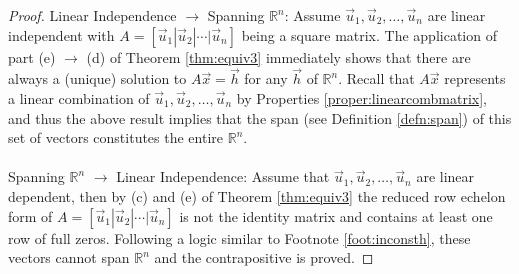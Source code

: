 \begin{proof}
Linear Independence $\rightarrow$ Spanning $\mathbb{R}^n$: Assume $\vec{u}_1, \vec{u}_2, \ldots, \vec{u}_n$ are linear independent with $A = [\vec{u}_1|\vec{u}_2|\cdots|\vec{u}_n]$ being a square matrix. The application of part (e) $\rightarrow$ (d) of Theorem \ref{thm:equiv3} immediately shows that there are always a (unique) solution to $A\vec{x} = \vec{h}$ for any $\vec{h}$ of $\mathbb{R}^n$. Recall that $A\vec{x}$ represents a linear combination of $\vec{u}_1, \vec{u}_2, \ldots, \vec{u}_n$ by Properties \ref{proper:linearcombmatrix}, and thus the above result implies that the span (see Definition \ref{defn:span}) of this set of vectors constitutes the entire $\mathbb{R}^n$.\\
\\
Spanning $\mathbb{R}^n$ $\rightarrow$ Linear Independence: Assume that $\vec{u}_1, \vec{u}_2, \ldots, \vec{u}_n$ are linear dependent, then by (c) and (e) of Theorem \ref{thm:equiv3} the reduced row echelon form of $A = [\vec{u}_1|\vec{u}_2|\cdots|\vec{u}_n]$ is not the identity matrix and contains at least one row of full zeros. Following a logic similar to Footnote \ref{foot:inconsth}, these vectors cannot span $\mathbb{R}^n$ and the contrapositive is proved. 
\end{proof}

